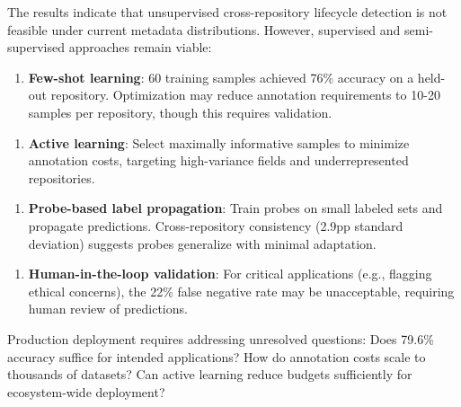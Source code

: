 The results indicate that unsupervised cross-repository lifecycle detection is not feasible under current metadata distributions. However, supervised and semi-supervised approaches remain viable:

\begin{enumerate}
\item \textbf{Few-shot learning}: 60 training samples achieved 76\% accuracy on a held-out repository. Optimization may reduce annotation requirements to 10-20 samples per repository, though this requires validation.
\end{enumerate}

\begin{enumerate}
\item \textbf{Active learning}: Select maximally informative samples to minimize annotation costs, targeting high-variance fields and underrepresented repositories.
\end{enumerate}

\begin{enumerate}
\item \textbf{Probe-based label propagation}: Train probes on small labeled sets and propagate predictions. Cross-repository consistency (2.9pp standard deviation) suggests probes generalize with minimal adaptation.
\end{enumerate}

\begin{enumerate}
\item \textbf{Human-in-the-loop validation}: For critical applications (e.g., flagging ethical concerns), the 22\% false negative rate may be unacceptable, requiring human review of predictions.
\end{enumerate}

Production deployment requires addressing unresolved questions: Does 79.6\% accuracy suffice for intended applications? How do annotation costs scale to thousands of datasets? Can active learning reduce budgets sufficiently for ecosystem-wide deployment?

